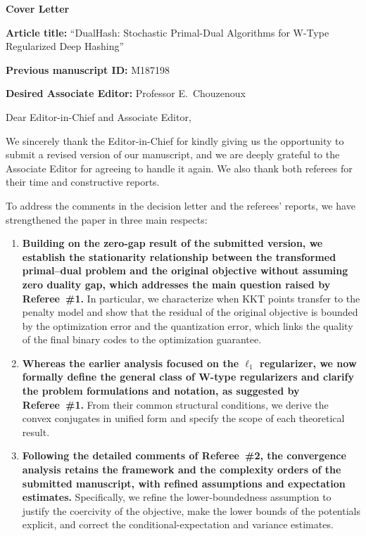 \documentclass[11pt]{article}
\begin{document}
\begin{center}
{\Large\bfseries Cover Letter\par}
\end{center}

\medskip
\noindent\textbf{Article title:} ``DualHash: Stochastic Primal-Dual Algorithms for W-Type Regularized Deep Hashing''

\vspace{0.3em}
\noindent\textbf{Previous manuscript ID:} M187198

\vspace{0.3em}
\noindent\textbf{Desired Associate Editor:} Professor E.~Chouzenoux

\bigskip
\noindent Dear Editor-in-Chief and Associate Editor,

\medskip
We sincerely thank the Editor-in-Chief for kindly giving us the opportunity to submit a revised version of our manuscript, and we are deeply grateful to the Associate Editor for agreeing to handle it again. We also thank both referees for their time and constructive reports.

To address the comments in the decision letter and the referees' reports, we have strengthened the paper in three main respects:
\begin{enumerate}[leftmargin=2em]
\item \textbf{Building on the zero-gap result of the submitted version, we establish the stationarity relationship between the transformed primal--dual problem and the original objective without assuming zero duality gap, which addresses the main question raised by Referee~\#1.} In particular, we characterize when KKT points transfer to the penalty model and show that the residual of the original objective is bounded by the optimization error and the quantization error, which links the quality of the final binary codes to the optimization guarantee.
\item \textbf{Whereas the earlier analysis focused on the $\ell_1$ regularizer, we now formally define the general class of W-type regularizers and clarify the problem formulations and notation, as suggested by Referee~\#1.} From their common structural conditions, we derive the convex conjugates in unified form and specify the scope of each theoretical result.
\item \textbf{Following the detailed comments of Referee~\#2, the convergence analysis retains the framework and the complexity orders of the submitted manuscript, with refined assumptions and expectation estimates.} Specifically, we refine the lower-boundedness assumption to justify the coercivity of the objective, make the lower bounds of the potentials explicit, and correct the conditional-expectation and variance estimates.
\end{enumerate}
\end{document}
